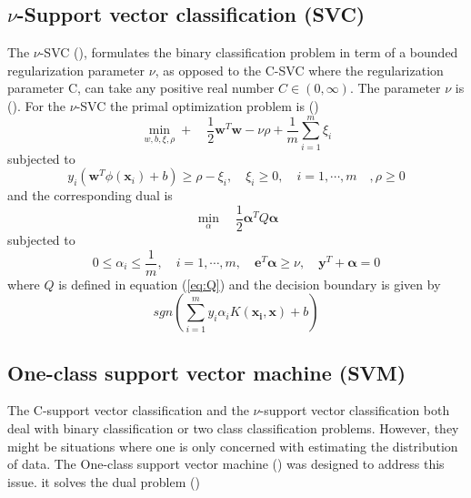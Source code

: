 \documentclass[../Main/thesis.tex]{subfiles}
\begin{document}
\subsection{$\nu$-Support vector classification (SVC)}
The $\nu$-SVC (\cite{kp2000}), formulates the binary classification problem in term of a bounded regularization
 parameter $\nu$, as opposed to the C-SVC where the regularization parameter C, can take any positive real number $C\in (0,\infty)$. The parameter $\nu$ is  (\cite{chang2001}). 
 \justify
 For the $\nu$-SVC the primal optimization problem is (\cite{chang2001})
 \begin{equation}
 \min_{w,b,\xi,\rho} +\quad \frac{1}{2}\bm{w}^{T}\bm{w}- \nu\rho + \frac{1}{m}\sum_{i = 1}^{m}\xi_{i}
 \end{equation}
 subjected to 
 \begin{equation}
 y_{i}(\bm{w}^{T}\phi(\bm{x}_{i}) + b) \geq \rho - \xi_{i}, \quad \xi_{i} \geq 0, \quad i = 1,\cdots,m \quad, \rho \geq 0
 \end{equation}
 and the corresponding dual is 
 \begin{equation}\label{eq:nudual1}
 \min_{\alpha}\quad \frac{1}{2}\bm{\alpha}^{T}Q\bm{\alpha}
 \end{equation}
 subjected to 
 \begin{equation}\label{eq:nudual2}
  0 \leq \alpha_{i} \leq \frac{1}{m},\quad  i = 1,\cdots, m, \quad \bm{e}^{T}\bm{\alpha} \geq \nu, \quad \bm{y}^{T}+\bm{\alpha} = 0
 \end{equation}
 where $Q$ is defined in equation (\ref{eq:Q}) and the decision boundary is given by
 \begin{equation}
 	sgn\left(  \sum_{i=1}^{m}y_{i}\alpha_{i}K(\bm{x_{i}},\bm{x}) +b\right)
 \end{equation}
 
 \subsection{One-class support vector machine (SVM)}
 The C-support vector classification and the $\nu$-support vector classification both deal with binary classification or two class classification problems. However, they might be situations where one is only concerned with estimating the distribution of data. The One-class support vector machine (\cite{kp2001}) was designed to address this issue.
 it solves the dual problem (\cite{chang2001})
 
\end{document}
